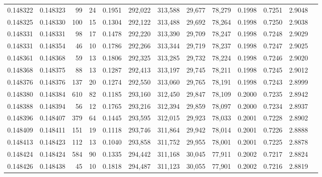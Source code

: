 \begin{tabular}{rrrrrrrrrrrrr}
0.148322 & 0.148323 &    99 &  24 &                                     0.1951 & 292,022 & 313,588 &  29,677 &  78,279 & 0.1998 & 0.7251 & 2.9048 \\
0.148325 & 0.148330 &   100 &  15 &                                     0.1304 & 292,122 & 313,488 &  29,692 &  78,264 & 0.1998 & 0.7250 & 2.9038 \\
0.148331 & 0.148331 &    98 &  17 &                                     0.1478 & 292,220 & 313,390 &  29,709 &  78,247 & 0.1998 & 0.7248 & 2.9029 \\
0.148331 & 0.148354 &    46 &  10 &                                     0.1786 & 292,266 & 313,344 &  29,719 &  78,237 & 0.1998 & 0.7247 & 2.9025 \\
0.148361 & 0.148368 &    59 &  13 &                                     0.1806 & 292,325 & 313,285 &  29,732 &  78,224 & 0.1998 & 0.7246 & 2.9020 \\
0.148368 & 0.148375 &    88 &  13 &                                     0.1287 & 292,413 & 313,197 &  29,745 &  78,211 & 0.1998 & 0.7245 & 2.9012 \\
0.148376 & 0.148376 &   137 &  20 &                                     0.1274 & 292,550 & 313,060 &  29,765 &  78,191 & 0.1998 & 0.7243 & 2.8999 \\
0.148380 & 0.148384 &   610 &  82 &                                     0.1185 & 293,160 & 312,450 &  29,847 &  78,109 & 0.2000 & 0.7235 & 2.8942 \\
0.148388 & 0.148394 &    56 &  12 &                                     0.1765 & 293,216 & 312,394 &  29,859 &  78,097 & 0.2000 & 0.7234 & 2.8937 \\
0.148396 & 0.148407 &   379 &  64 &                                     0.1445 & 293,595 & 312,015 &  29,923 &  78,033 & 0.2001 & 0.7228 & 2.8902 \\
0.148409 & 0.148411 &   151 &  19 &                                     0.1118 & 293,746 & 311,864 &  29,942 &  78,014 & 0.2001 & 0.7226 & 2.8888 \\
0.148413 & 0.148423 &   112 &  13 &                                     0.1040 & 293,858 & 311,752 &  29,955 &  78,001 & 0.2001 & 0.7225 & 2.8878 \\
0.148424 & 0.148424 &   584 &  90 &                                     0.1335 & 294,442 & 311,168 &  30,045 &  77,911 & 0.2002 & 0.7217 & 2.8824 \\
0.148426 & 0.148438 &    45 &  10 &                                     0.1818 & 294,487 & 311,123 &  30,055 &  77,901 & 0.2002 & 0.7216 & 2.8819 \\

\end{tabular}
